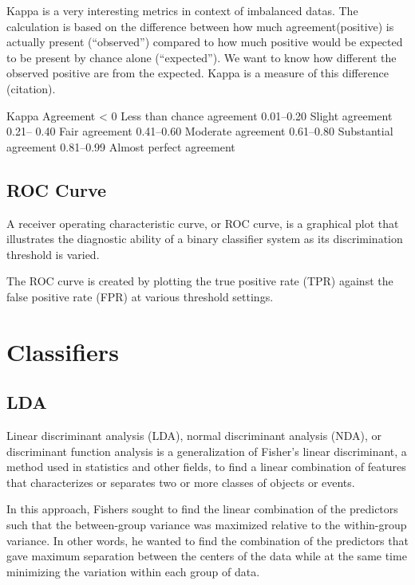 \documentclass[
]{report}
\begin{document}
Kappa is a very interesting metrics in context of imbalanced datas.
The calculation is based on the difference between how much agreement(positive) is actually present (``observed'') compared to how much positive would be expected to be present by chance alone (``expected''). We want to know how different the observed positive are from the expected. Kappa is a measure of this difference (citation).

Kappa Agreement
\textless{} 0 Less than chance agreement
0.01--0.20 Slight agreement
0.21-- 0.40 Fair agreement
0.41--0.60 Moderate agreement
0.61--0.80 Substantial agreement
0.81--0.99 Almost perfect agreement

\hypertarget{roc-curve}{%
\section{ROC Curve}\label{roc-curve}}

A receiver operating characteristic curve, or ROC curve, is a graphical plot that illustrates the diagnostic ability of a binary classifier system as its discrimination threshold is varied.

The ROC curve is created by plotting the true positive rate (TPR) against the false positive rate (FPR) at various threshold settings.

\hypertarget{classifiers}{%
\chapter{Classifiers}\label{classifiers}}

\hypertarget{lda}{%
\section{LDA}\label{lda}}

Linear discriminant analysis (LDA), normal discriminant analysis (NDA), or discriminant function analysis is a generalization of Fisher's linear discriminant, a method used in statistics and other fields, to find a linear combination of features that characterizes or separates two or more classes of objects or events.

In this approach, Fishers sought to ﬁnd the linear combination of the predictors such that the between-group variance was maximized relative to the within-group variance. In other words, he wanted to ﬁnd the combination of the predictors that gave maximum separation between the centers of the data while at the same time minimizing the variation within each group of data.
\end{document}
